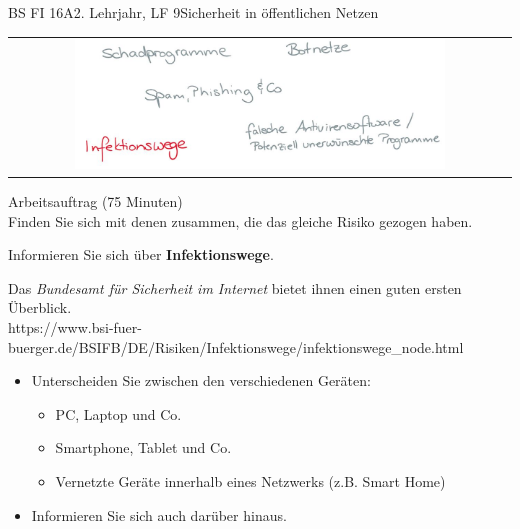 \documentclass[oneside,openany,headings=optiontotoc,11pt,numbers=noenddot]{scrreprt}
\begin{document}
\begin{worksheet}{BS FI 16A}{2. Lehrjahr, LF 9}{Sicherheit in öffentlichen Netzen}
		\newpage
		\setcounter{page}{1}
		\begin{framed}
			\begin{tabular}{lcr}
				& \includegraphics[width=0.8\textwidth]{Bilder/Infektionswege.jpg} & \\
			\end{tabular}
		\end{framed}
		\color{codegray}Arbeitsauftrag (75 Minuten)\\
		\color{black}
		Finden Sie sich mit denen zusammen, die das gleiche Risiko gezogen haben.
		\par
		\bigskip
		\noindent
		Informieren Sie sich über \textbf{Infektionswege}.
		\par
		\bigskip
		\noindent
		Das \textit{Bundesamt für Sicherheit im Internet} bietet ihnen einen guten ersten Überblick.\\
		\small{\color{codegray}https://www.bsi-fuer-buerger.de/BSIFB/DE/Risiken/Infektionswege/infektionswege\_node.html}
		\normalsize
		\begin{itemize}
			\item[] Unterscheiden Sie zwischen den verschiedenen Geräten:
			\begin{itemize}
				\item PC, Laptop und Co.
				\item Smartphone, Tablet und Co.
				\item Vernetzte Geräte innerhalb eines Netzwerks (z.B. Smart Home)
			\end{itemize}
			\item[] Informieren Sie sich auch darüber hinaus.
		\end{itemize}
	

\end{worksheet}
\end{document}
